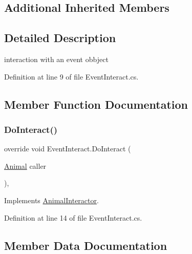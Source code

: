 \subsection*{Additional Inherited Members}


\subsection{Detailed Description}
interaction with an event obbject 



Definition at line 9 of file Event\+Interact.\+cs.



\subsection{Member Function Documentation}
\mbox{\label{class_event_interact_a42b9c48803be9e90086d545a07fb1b74}} 
\subsubsection{\texorpdfstring{Do\+Interact()}{DoInteract()}}
{\footnotesize\ttfamily override void Event\+Interact.\+Do\+Interact (\begin{DoxyParamCaption}\item[{\mbox{\hyperlink{class_animal}{Animal}}}]{caller }\end{DoxyParamCaption})\hspace{0.3cm}{\ttfamily [protected]}, {\ttfamily [virtual]}}



Implements \mbox{\hyperlink{class_animal_interactor_a522811ab410a5acbc12362e29263c5a8}{Animal\+Interactor}}.



Definition at line 14 of file Event\+Interact.\+cs.



\subsection{Member Data Documentation}
\mbox{\label{class_event_interact_abb244470fb0d4ff85e6615a7683b0211}} 
